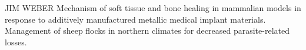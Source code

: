 \documentclass[11pt]{article}
\begin{document}
\begin{description}[topsep=0pt, noitemsep]
\begin{description}[topsep=11pt, noitemsep]
JIM WEBER Mechanism of soft tissue and bone healing in mammalian models in response to additively manufactured metallic medical implant materials.
Management of sheep flocks in northern climates for decreased parasite-related losses.

\end{description}
\end{description}
\end{document}
